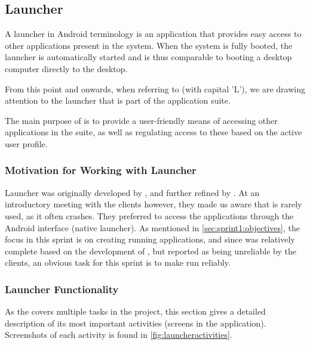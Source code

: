 \subsection{Launcher}\label{sec:launcher}
A launcher in Android terminology is an application that provides easy access to other applications present in the system.
When the system is fully booted, the launcher is automatically started and is thus comparable to booting a desktop computer directly to the desktop.

From this point and onwards, when referring to \textit{\launcher} (with capital 'L'), we are drawing attention to the launcher that is part of the \giraf application suite.

The main purpose of \launcher is to provide a user-friendly means of accessing other applications in the \giraf suite, as well as regulating access to these based on the active user profile.

\subsubsection{Motivation for Working with Launcher}
Launcher was originally developed by \citet{launcher2011}, and further refined by \citet{launcher2012}.
At an introductory meeting with the clients however, they made us aware that \launcher is rarely used, as it often crashes.
They preferred to access the \giraf applications through the Android interface (native launcher).
As mentioned in \cref{sec:sprint1:objectives}, the focus in this sprint is on creating running applications, and since \launcher was relatively complete based on the development of \citet{launcher2012}, but reported as being unreliable by the clients, an obvious task for this sprint is to make \launcher run reliably.

\subsubsection{Launcher Functionality}
As the \launcher covers multiple tasks in the \giraf project, this section gives a detailed description of its most important activities (screens in the application).
Screenshots of each activity is found in \cref{fig:launcheractivities}.

